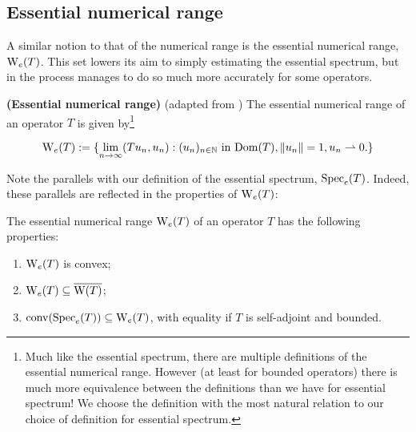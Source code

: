 \documentclass[../main.tex]{subfiles}
\begin{document}
\subsection{Essential numerical range}
A similar notion to that of the numerical range is the essential numerical range, $\mathrm{W}_e (T)$. This set lowers its aim to simply estimating the essential spectrum,
but in the process manages to do so much more accurately for some operators.

\begin{definition}{\textbf{(Essential numerical range)}} (adapted from \cite{fillmore1972essential})
The essential numerical range of an operator $T$ is given by\footnote{Much like the essential spectrum, there are multiple definitions of the essential numerical range.
However (at least for bounded operators) there is much more equivalence between the definitions than we have for essential spectrum! \cite{fillmore1972essential} We choose the definition with the most
natural relation to our choice of definition for essential spectrum.}

$$\mathrm{W}_e (T) := \{\lim_{n \rightarrow \infty}( Tu_n, u_n ) : (u_n)_{n \in \mathbb{N}}\text{ in } \mathrm{Dom}(T), \|u_n\|=1, u_n \rightharpoonup 0.\}$$
\end{definition}
Note the parallels with our definition of the essential spectrum, $\mathrm{Spec}_e(T)$. Indeed, these parallels are reflected in the properties of $\mathrm{W}_e(T)$:

\begin{proposition}\label{thm:nume-props} The essential numerical range $\mathrm{W}_e(T)$ of an operator $T$ has the following properties:
\begin{enumerate}
\item\label{item:nume-convex} $\mathrm{W}_e(T)$ is convex;
\item\label{item:nume-in-clos-num} $\mathrm{W}_e(T) \subseteq \overline{\mathrm{W}(T)}$;
\item\label{item:nume-is-hull} $\mathrm{conv}(\mathrm{Spec}_e(T)) \subseteq \mathrm{W}_e(T)$, with equality if $T$ is self-adjoint and bounded.
\end{enumerate}
\end{proposition}
\end{document}
